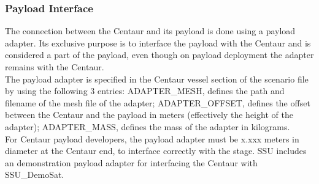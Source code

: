 \documentclass[Space_Shuttle_Ultra_Manual.tex]{subfiles}
\begin{document}
\begin{multicols*}{2}
\subsubsection{Payload Interface}
The connection between the Centaur and its payload is done using a payload adapter. Its exclusive purpose is to interface the payload with the Centaur and is considered a part of the payload, even though on payload deployment the adapter remains with the Centaur.\\
The payload adapter is specified in the Centaur vessel section of the scenario file by using the following 3 entries: ADAPTER\_MESH, defines the path and filename of the mesh file of the adapter; ADAPTER\_OFFSET, defines the offset between the Centaur and the payload in meters (effectively the height of the adapter); ADAPTER\_MASS, defines the mass of the adapter in kilograms.\\
For Centaur payload developers, the payload adapter must be x.xxx meters in diameter at the Centaur end, to interface correctly with the stage. SSU includes an demonstration payload adapter for interfacing the Centaur with SSU\_DemoSat.

\end{multicols*}
\newpage
\end{document}
